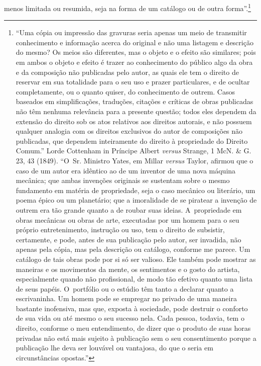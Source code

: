 menos limitada ou resumida, seja na forma de um catálogo ou de outra
forma''.\footnote{``Uma cópia ou impressão das gravuras seria apenas um
  meio de transmitir conhecimento e informação acerca do original e não
  uma listagem e descrição do mesmo? Os meios são diferentes, mas o
  objeto e o efeito são similares; pois em ambos o objeto e efeito é
  trazer ao conhecimento do público algo da obra e da composição não
  publicadas pelo autor, as quais ele tem o direito de reservar em sua
  totalidade para o seu uso e prazer particulares, e de ocultar
  completamente, ou o quanto quiser, do conhecimento de outrem. Casos
  baseados em simplificações, traduções, citações e críticas de obras
  publicadas não têm nenhuma relevância para a presente questão; todos
  eles dependem da extensão do direito sob os atos relativos aos
  direitos autorais, e não possuem qualquer analogia com os direitos
  exclusivos do autor de composições não publicadas, que dependem
  inteiramente do direito à propriedade do Direito Comum.'' Lorde
  Cottenham in Príncipe Albert \emph{versus} Strange, 1 McN. \& G. 23,
  43 (1849). ``O~Sr. Ministro Yates, em Millar \emph{versus} Taylor,
  afirmou que o caso de um autor era idêntico ao de um inventor de uma
  nova máquina mecânica; que ambas invenções originais se sustentam
  sobre o mesmo fundamento em matéria de propriedade, seja o caso
  mecânico ou literário, um poema épico ou um planetário; que a
  imoralidade de se piratear a invenção de outrem era tão grande quanto
  a de roubar suas ideias. A~propriedade em obras mecânicas ou obras de
  arte, executadas por um homem para o seu próprio entretenimento,
  instrução ou uso, tem o direito de subsistir, certamente, e pode,
  antes de sua publicação pelo autor, ser invadida, não apenas pela
  cópia, mas pela descrição ou catálogo, conforme me parece. Um catálogo
  de tais obras pode por si só ser valioso. Ele também pode mostrar as
  maneiras e os movimentos da mente, os sentimentos e o gosto do
  artista, especialmente quando não profissional, de modo tão efetivo
  quanto uma lista de seus papéis. O~portfólio ou o estúdio têm tanto a
  declarar quanto a escrivaninha. Um homem pode se empregar no privado
  de uma maneira bastante inofensiva, mas que, exposta à sociedade, pode
  destruir o conforto de sua vida ou até mesmo o seu sucesso nela. Cada
  pessoa, todavia, tem o direito, conforme o meu entendimento, de dizer
  que o produto de suas horas privadas não está mais sujeito à
  publicação sem o seu consentimento porque a publicação lhe deva ser
  louvável ou vantajosa, do que o seria em circunstâncias opostas.''

}
